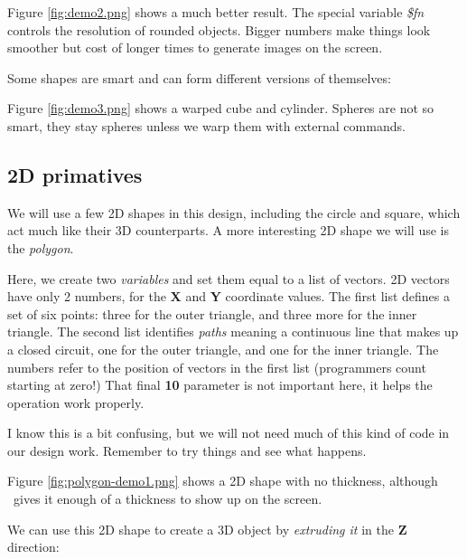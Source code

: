 
Figure \ref{fig:demo2.png} shows a much better result. The special variable
{\it \$fn} controls the resolution of rounded objects. Bigger numbers make
things look smoother but cost of longer times to generate images on the screen.



Some shapes are smart and can form different versions of themselves:


Figure \ref{fig:demo3.png} shows a warped cube and cylinder. Spheres are not so
smart, they stay spheres unless we warp them with external commands.



\subsection{2D primatives}

We will use a few 2D shapes in this design, including the circle and square,
which act much like their 3D counterparts. A more interesting 2D shape we will
use is the {\it polygon}.


Here, we create two {\it variables} and set them equal to a list of vectors. 2D
vectors have only 2 numbers, for the {\bf X} and {\bf Y} coordinate values. The
first list defines a set of six points: three for the outer triangle, and three
more for the inner triangle. The second list identifies {\it paths} meaning a
continuous line that makes up a closed circuit, one for the outer triangle, and
one for the inner triangle. The numbers refer to the position of vectors in the
first list (programmers count starting at zero!) That final {\bf 10} parameter
is not important here, it helps the operation work properly.

I know this is a bit confusing, but we will not need much of this kind of code
in our design work. Remember to try things and see what happens.


Figure \ref{fig:polygon-demo1.png} shows a  2D shape with no thickness, although
\osc\ gives it enough of a thickness to show up on the screen.

We can use this 2D shape to create a 3D object by {\it extruding it} in the
{\bf Z} direction:

